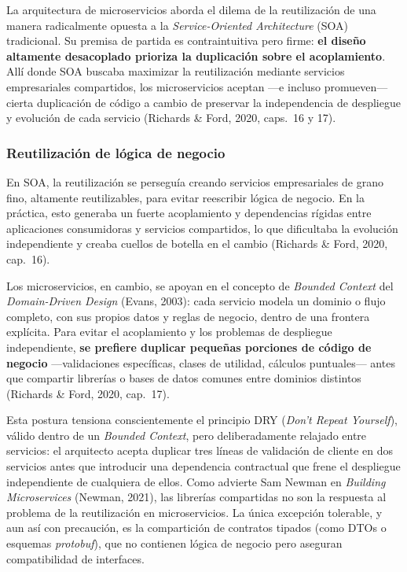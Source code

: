 
La arquitectura de microservicios aborda el dilema de la reutilización de una manera
radicalmente opuesta a la \emph{Service-Oriented Architecture} (SOA) tradicional. Su
premisa de partida es contraintuitiva pero firme: \textbf{el diseño altamente
desacoplado prioriza la duplicación sobre el acoplamiento}. Allí donde SOA buscaba
maximizar la reutilización mediante servicios empresariales compartidos, los
microservicios aceptan ---e incluso promueven--- cierta duplicación de código a
cambio de preservar la independencia de despliegue y evolución de cada servicio
(Richards \& Ford, 2020, caps.~16 y 17).

\subsubsection{Reutilización de lógica de negocio}

En SOA, la reutilización se perseguía creando servicios empresariales de grano fino,
altamente reutilizables, para evitar reescribir lógica de negocio. En la práctica,
esto generaba un fuerte acoplamiento y dependencias rígidas entre aplicaciones
consumidoras y servicios compartidos, lo que dificultaba la evolución independiente
y creaba cuellos de botella en el cambio (Richards \& Ford, 2020, cap.~16).

Los microservicios, en cambio, se apoyan en el concepto de \emph{Bounded Context} del
\emph{Domain-Driven Design} (Evans, 2003): cada servicio modela un dominio o
flujo completo, con sus propios datos y reglas de negocio, dentro de una frontera
explícita. Para evitar el acoplamiento y los problemas de despliegue independiente,
\textbf{se prefiere duplicar pequeñas porciones de código de negocio} ---validaciones
específicas, clases de utilidad, cálculos puntuales--- antes que compartir librerías
o bases de datos comunes entre dominios distintos (Richards \& Ford, 2020, cap.~17).

Esta postura tensiona conscientemente el principio DRY (\emph{Don't Repeat Yourself}),
válido dentro de un \emph{Bounded Context}, pero deliberadamente relajado entre
servicios: el arquitecto acepta duplicar tres líneas de validación de cliente en
dos servicios antes que introducir una dependencia contractual que frene el despliegue
independiente de cualquiera de ellos. Como advierte Sam Newman en \emph{Building
Microservices} (Newman, 2021), las librerías compartidas
no son la respuesta al problema de la reutilización en microservicios. La única
excepción tolerable, y aun así con precaución, es la compartición de contratos
tipados (como DTOs o esquemas \emph{protobuf}), que no contienen lógica de negocio
pero aseguran compatibilidad de interfaces.

